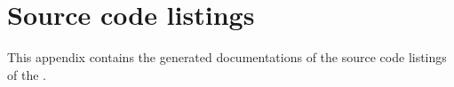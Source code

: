 \chapter{Source code listings}
\label{chap:sourceListings}

This appendix contains the generated documentations of the source code listings of the \applicationname{}.



